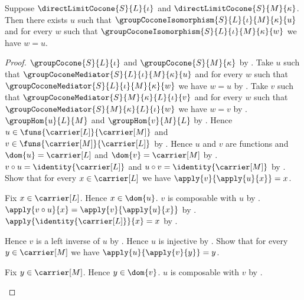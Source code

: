\begin{theorem}\label{direct_limit_cocone_comparison}
    Suppose $\directLimitCocone{S}{L}{\iota}$ and
        $\directLimitCocone{S}{M}{\kappa}$.
    Then there exists $u$ such that
        $\groupCoconeIsomorphism{S}{L}{\iota}{M}{\kappa}{u}$ and
        for every $w$ such that
            $\groupCoconeIsomorphism{S}{L}{\iota}{M}{\kappa}{w}$
        we have $w=u$.
\end{theorem}
\begin{proof}
    $\groupCocone{S}{L}{\iota}$ and
        $\groupCocone{S}{M}{\kappa}$ by
        .
    Take $u$ such that
        $\groupCoconeMediator{S}{L}{\iota}{M}{\kappa}{u}$ and
        for every $w$ such that
            $\groupCoconeMediator{S}{L}{\iota}{M}{\kappa}{w}$
        we have $w=u$ by
        .
    Take $v$ such that
        $\groupCoconeMediator{S}{M}{\kappa}{L}{\iota}{v}$ and
        for every $w$ such that
            $\groupCoconeMediator{S}{M}{\kappa}{L}{\iota}{w}$
        we have $w=v$ by
        .
    $\groupHom{u}{L}{M}$ and $\groupHom{v}{M}{L}$ by
        .
    Hence $u\in\funs{\carrier[L]}{\carrier[M]}$ and
        $v\in\funs{\carrier[M]}{\carrier[L]}$ by
        .
    Hence $u$ and $v$ are functions and
        $\dom{u}=\carrier[L]$ and $\dom{v}=\carrier[M]$ by
        .
    $v\circ u=\identity{\carrier[L]}$ and
        $u\circ v=\identity{\carrier[M]}$ by
        .
    Show that for every $x\in\carrier[L]$ we have
        $\apply{v}{\apply{u}{x}}=x$.
    \begin{subproof}
        Fix $x\in\carrier[L]$.
        Hence $x\in\dom{u}$.
        $v$ is composable with $u$ by
            .
        $\apply{v\circ u}{x}=\apply{v}{\apply{u}{x}}$ by
            .
        $\apply{\identity{\carrier[L]}}{x}=x$ by
            .
    \end{subproof}
    Hence $v$ is a left inverse of $u$ by
        .
    Hence $u$ is injective by
        .
    Show that for every $y\in\carrier[M]$ we have
        $\apply{u}{\apply{v}{y}}=y$.
    \begin{subproof}
        Fix $y\in\carrier[M]$.
        Hence $y\in\dom{v}$.
        $u$ is composable with $v$ by
            .

\end{subproof}
\end{proof}

